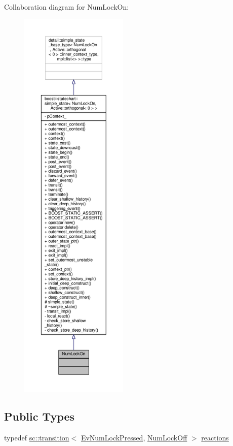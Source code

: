 Collaboration diagram for Num\+Lock\+On\+:
\nopagebreak
\begin{figure}[H]
\begin{center}
\leavevmode
\includegraphics[height=550pt]{struct_num_lock_on__coll__graph}
\end{center}
\end{figure}
\subsection*{Public Types}
\begin{DoxyCompactItemize}
\item 
typedef \mbox{\hyperlink{classboost_1_1statechart_1_1transition}{sc\+::transition}}$<$ \mbox{\hyperlink{struct_ev_num_lock_pressed}{Ev\+Num\+Lock\+Pressed}}, \mbox{\hyperlink{struct_num_lock_off}{Num\+Lock\+Off}} $>$ \mbox{\hyperlink{struct_num_lock_on_a9af5eef535acd3b1a829bfa8e8c49849}{reactions}}
\end{DoxyCompactItemize}
